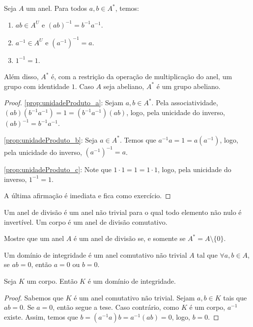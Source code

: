 \begin{prop}
Seja $A$ um anel. Para todos $a, b \in A^*$, temos:
\begin{enumerate}[label=\alph*)]
    \item $ab\in A^U$ e $(ab)^{-1}=b^{-1}a^{-1}$.\label{prop:unidadeProduto_a}
    \item $a^{-1}\in A^U$ e $(a^{-1})^{-1}=a$.\label{prop:unidadeProduto_b}
    \item $1^{-1}=1$.\label{prop:unidadeProduto_c}
\end{enumerate}
Além disso, $A^*$ é, com a restrição da operação de multiplicação do anel, um grupo com identidade $1$. Caso $A$ seja abeliano, $A^*$ é um grupo abeliano.
\end{prop}
\begin{proof}
    \ref{prop:unidadeProduto_a}: Sejam $a, b \in A^*$. Pela associatividade, $(ab)(b^{-1}a^{-1})=1=(b^{-1}a^{-1})(ab)$, logo, pela unicidade do inverso, $(ab)^{-1}=b^{-1}a^{-1}$.

    \ref{prop:unidadeProduto_b}: Seja $a \in A^*$. Temos que $a^{-1}a=1=a(a^{-1})$, logo, pela unicidade do inverso, $(a^{-1})^{-1}=a$.

    \ref{prop:unidadeProduto_c}: Note que $1\cdot 1=1=1\cdot 1$, logo, pela unicidade do inverso, $1^{-1}=1$.

    A última afirmação é imediata e fica como exercício.
\end{proof}

\begin{definition}
Um anel de divisão é um anel não trivial para o qual todo elemento não nulo é invertível. Um corpo é um anel de divisão comutativo.
\end{definition}

\begin{exer}
    Mostre que um anel $A$ é um anel de divisão se, e somente se $A^*=A\setminus\{0\}$.
\end{exer}
\begin{definition}
    Um domínio de integridade é um anel comutativo não trivial $A$ tal que $\forall a, b \in A$, se $ab=0$, então $a=0$ ou $b=0$.
\end{definition}

\begin{prop}
    Seja $K$ um corpo. Então $K$ é um domínio de integridade.
\end{prop}
\begin{proof}
Sabemos que $K$ é um anel comutativo não trivial. Sejam $a, b \in K$ tais que $ab=0$. Se $a=0$, então segue a tese. Caso contrário, como $K$ é um corpo, $a^{-1}$ existe. Assim, temos que $b=(a^{-1}a)b=a^{-1}(ab)=0$, logo, $b=0$.
\end{proof}
